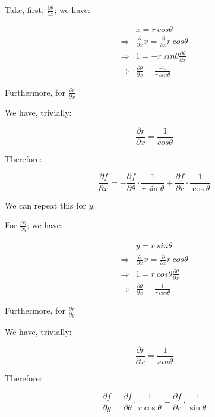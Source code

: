 \documentclass[letterpaper]{article}
\begin{document}
Take, first, \(\frac{\partial \theta}{\partial x}\); we have:

\begin{align}
   &x = r\ cos\theta \\
\Rightarrow &\frac{\partial}{\partial x} x = \frac{\partial}{\partial x}r\ cos\theta \\
\Rightarrow &1 = -r\ sin\theta \frac{\partial \theta}{\partial x}\\
\Rightarrow &\frac{\partial \theta}{\partial x} = \frac{-1}{r\ sin\theta} 
\end{align}

Furthermore, for \(\frac{\partial r}{\partial x}\)

We have, trivially:

\begin{equation}
\frac{\partial r}{\partial x} = \frac{1}{cos\theta}
\end{equation}

Therefore:

\begin{equation}
   \frac{\partial f}{\partial x} = -\frac{\partial f}{\partial \theta}\cdot \frac{1}{r\sin\theta} + \frac{\partial f}{\partial r}\cdot \frac{1}{\cos\theta}
\end{equation}

We can repeat this for \(y\):

For \(\frac{\partial \theta}{\partial y}\); we have:

\begin{align}
   &y = r\ sin\theta \\
\Rightarrow &\frac{\partial}{\partial x} x = \frac{\partial}{\partial x}r\ cos\theta \\
\Rightarrow &1 = r\ cos\theta \frac{\partial \theta}{\partial x}\\
\Rightarrow &\frac{\partial \theta}{\partial x} = \frac{1}{r\ cos\theta} 
\end{align}

Furthermore, for \(\frac{\partial r}{\partial y}\)

We have, trivially:

\begin{equation}
\frac{\partial r}{\partial x} = \frac{1}{sin\theta}
\end{equation}

Therefore:

\begin{equation}
   \frac{\partial f}{\partial y} = \frac{\partial f}{\partial \theta}\cdot \frac{1}{r\cos\theta} + \frac{\partial f}{\partial r}\cdot \frac{1}{\sin\theta}
\end{equation}
\end{document}
